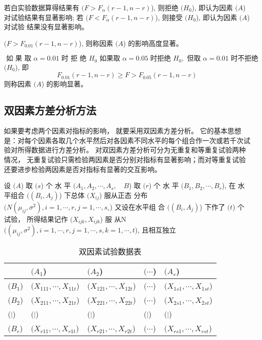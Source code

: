 若白实验数据算得结果有 $( {F}>{F}_{{\alpha}}({r}-{1}, {n}-{r}) $), 则拒绝 $( {H}_{0} $), 即认为因素 $( {A} $) 对试验结果有显著影响; 若 $( {F}<{F}_{\alpha}({r}-{1}, {n}-{r}) $), 则接受 $( {H}_{{0}} $), 即认为因素 $( {A} $) 对试验
结果没有显著影响。 

$( F>F_{0.01}(r-1, n-r) $), 则称因素 $( A $) 的影响高度显著。 

$\text { 如 果 取 } \alpha={0 . 0 1} \text { 时 拒 绝 } {H}_{{0}}
\text { 如果取 } \alpha=0.05 \text { 时拒绝 } {H}_{0}, \text { 但取 } \alpha=0.01 \text { 时不拒绝 }$
$( {H}_{{0}} $), 即
\begin{equation}
F_{0.01}(r-1, n-r) \geq F>F_{0.05}(r-1, n-r)
\end{equation}
则称因素 $( {A} $) 的影响显著。 

\subsection{双因素方差分析方法}

如果要考虑两个因素对指标的影响， 就要采用双因素方差分析。 它的基本思想是：对每个因素各取几个水平然后对各因素不同水平的每个组合作一次或若千次试验对所得数据进行方差分析。 对双因素方差分析可分为无重复和等重复试验两种情况， 无重复试验只需检验两因素是否分别对指标有显著影响；而对等重复试验还要进步检验两因素是否对指标有显著的交互影响。 

设 $( {A} $) 取 $( {s} $) 个 水 平 $( {A}_{{1}}, {A}_{2}, \cdots, {A}_{s}, \quad {B} $) 取 $( {r} $) 个 水 平
$( {B}_{1}, {B}_{2}, \cdots, {B}_{r} $), 在 水平组合 $( \left({B}_{i}, {A}_{j}\right) $) 下总体 $( {X}_{i j} $) 服从正态
分布 $( N\left(\mu_{i j}, \sigma^{2}\right), i=1, \cdots, r, j=1, \cdots, s_{\circ} $) 又设在水平组
合 $( \left({B}_{i}, {A}_{j}\right) $) 下作了 $( {t} $) 个试验， 所得结果记作 $( {X}_{i j k}, {X}_{i j k} $) 服
从N $( \left(\mu_{i j}, \sigma^{2}\right), i=1, \cdots, r, j=1, \cdots, s, k=1, \cdots, t $), 且相互独立

\begin{table}
        \caption{双因素试验数据表}
        \begin{tabular}{l|llll}
        \hline & $( A_{1} $) & $( A_{2} $) & $( \cdots $) & $( A_{s} $) \\
        \hline $( {B}_{1} $) & $( X_{111}, \cdots, X_{11 t} $) & $( X_{121}, \cdots, X_{12 t} $) & $( \cdots $) & $( X_{1 s 1}, \cdots, X_{1 s t} $) \\
        $( B_{2} $) & $( X_{211}, \cdots, X_{21 t} $) & $( X_{221}, \cdots, X_{22 t} $) & $( \cdots $) & $( X_{2 s 1}, \cdots, X_{2 s t} $) \\
        $( \vdots $) & $( \vdots $) & $( \vdots $) & $( \vdots $) & $( \vdots $) \\
        $( B_{r} $) & $( X_{r 11}, \cdots, X_{r 1 t} $) & $( X_{r 21}, \cdots, X_{r 2 t} $) & $( \cdots $) & $( X_{r s 1}, \cdots, X_{r s t} $) \\
        \hline
        \end{tabular}
\end{table}

